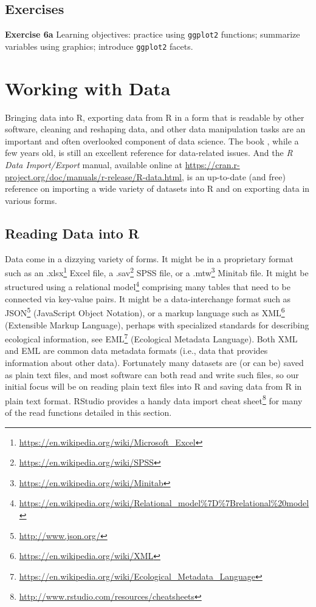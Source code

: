 \documentclass[]{krantz}
\renewcommand{\href}[2]{#2\footnote{\url{#1}}}
\begin{document}
\section{Exercises}\label{exercises-2}

\textbf{Exercise 6a} Learning objectives: practice using
\texttt{ggplot2} functions; summarize variables using graphics;
introduce \texttt{ggplot2} facets.

\chapter{Working with Data}\label{data2}

Bringing data into R, exporting data from R in a form that is readable
by other software, cleaning and reshaping data, and other data
manipulation tasks are an important and often overlooked component of
data science. The book \citet{SpectorDataManipulation}, while a few
years old, is still an excellent reference for data-related issues. And
the \emph{R Data Import/Export} manual, available online at
\url{https://cran.r-project.org/doc/manuals/r-release/R-data.html}, is
an up-to-date (and free) reference on importing a wide variety of
datasets into R and on exporting data in various forms.

\section{Reading Data into R}\label{reading-data-into-r}

Data come in a dizzying variety of forms. It might be in a proprietary
format such as an
\href{https://en.wikipedia.org/wiki/Microsoft_Excel}{.xlsx} Excel file,
a \href{https://en.wikipedia.org/wiki/SPSS}{.sav} SPSS file, or a
\href{https://en.wikipedia.org/wiki/Minitab}{.mtw} Minitab file. It
might be structured using a
\href{https://en.wikipedia.org/wiki/Relational_model\%7D\%7Brelational\%20model}{relational
model} comprising many tables that need to be connected via key-value
pairs. It might be a data-interchange format such as
\href{http://www.json.org/}{JSON} (JavaScript Object Notation), or a
markup language such as \href{https://en.wikipedia.org/wiki/XML}{XML}
(Extensible Markup Language), perhaps with specialized standards for
describing ecological information, see
\href{https://en.wikipedia.org/wiki/Ecological_Metadata_Language}{EML}
(Ecological Metadata Language). Both XML and EML are common data
metadata formats (i.e., data that provides information about other
data). Fortunately many datasets are (or can be) saved as plain text
files, and most software can both read and write such files, so our
initial focus will be on reading plain text files into R and saving data
from R in plain text format. RStudio provides a handy
\href{http://www.rstudio.com/resources/cheatsheets}{data import cheat
sheet} for many of the read functions detailed in this section.
\end{document}
